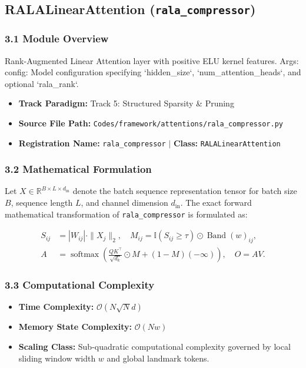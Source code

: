 \subsection{RALALinearAttention (\texttt{rala\_compressor})}
\label{sec:app_module_rala\_compressor}

\subsubsection*{3.1 Module Overview}
Rank-Augmented Linear Attention layer with positive ELU kernel features.  Args:     config: Model configuration specifying `hidden\_size`, `num\_attention\_heads`, and optional `rala\_rank`.
\begin{itemize}
    \item \textbf{Track Paradigm:} Track 5: Structured Sparsity & Pruning
    \item \textbf{Source File Path:} \texttt{Codes/framework/attentions/rala\_compressor.py}
    \item \textbf{Registration Name:} \texttt{rala\_compressor} $\mid$ \textbf{Class:} \texttt{RALALinearAttention}
\end{itemize}

\subsubsection*{3.2 Mathematical Formulation}
Let $X \in \mathbb{R}^{B \times L \times d_{\text{in}}}$ denote the batch sequence representation tensor for batch size $B$, sequence length $L$, and channel dimension $d_{\text{in}}$. The exact forward mathematical transformation of \texttt{rala\_compressor} is formulated as:

\begin{align}
S_{ij} &= |W_{ij}| \cdot \|X_j\|_2, \quad M_{ij} = \mathbb{I}(S_{ij} \ge \tau) \odot \operatorname{Band}(w)_{ij}, \\
A &= \operatorname{softmax}\left(\frac{Q K^\top}{\sqrt{d_k}} \odot M + (1 - M)(-\infty)\right), \quad O = A V.
\end{align}


\subsubsection*{3.3 Computational Complexity}
\begin{itemize}
    \item \textbf{Time Complexity:} $\mathcal{O}(N \sqrt{N} d)$
    \item \textbf{Memory State Complexity:} $\mathcal{O}(N w)$
    \item \textbf{Scaling Class:} Sub-quadratic computational complexity governed by local sliding window width $w$ and global landmark tokens.
\end{itemize}

